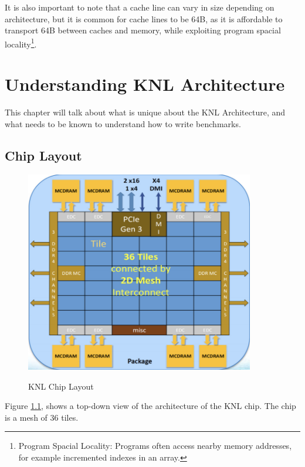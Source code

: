 \documentclass[bsc,frontabs,twoside,singlespacing,parskip,deptreport]{infthesis}     %
\begin{document}
It is also important to note that a cache line can vary in size depending on architecture, but it is common for cache lines to be 64B, as it is affordable to transport 64B between caches and memory, while exploiting program spacial locality\footnote{Program Spacial Locality: Programs often access nearby memory addresses, for example incremented indexes in an array.}.

\newpage

\chapter{Understanding KNL Architecture}
This chapter will talk about what is unique about the KNL Architecture, and what needs to be known to understand how to write benchmarks.
\section{Chip Layout}
\begin{figure}[h]
    \includegraphics[width=10cm]{KNL_Overview.png}
    \centering
    \caption{KNL Chip Layout}
    \protect\cite{intel_pres}
    \label{fig:chip-overview}
\end{figure}
Figure \ref{fig:chip-overview}, shows a top-down view of the architecture of the KNL chip. The chip is a mesh of 36 tiles.
\end{document}
